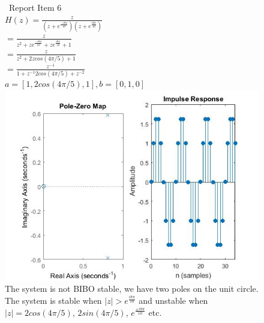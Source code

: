 \documentclass{article}
\begin{document}
\begin{figure}[H]
\ Report Item 6
\\ $H(z) = \frac{z}{{(z+e^{\frac{-i8\pi}{10}})(z+e^{\frac{i8\pi}{10}})}}$
\\ $ = \frac{z}{z^2 + ze^{\frac{-i8\pi}{10}} + ze^{\frac{i8\pi}{10}} + 1}$
\\ $ = \frac{z}{z^2+2zcos(4\pi/5) + 1}$
\\ $ = \frac{z^{-1}}{1 + z^{-1}2cos(4\pi/5) + z^{-2}}$
\\ $ a = [1,2cos(4\pi/5),1], b = [0,1,0]$
\includegraphics[scale = .5]{report6}
\\ The system is not BIBO stable, we have two poles on the unit circle.  The system is stable when $|z| > e^{\frac{i8\pi}{10}}$ and unstable when $|z| = 2cos(4\pi/5)$, $2sin(4\pi/5)$, $e^{\frac{\pm i8\pi}{10}}$ etc.
\end{figure}



\break
\end{document}
